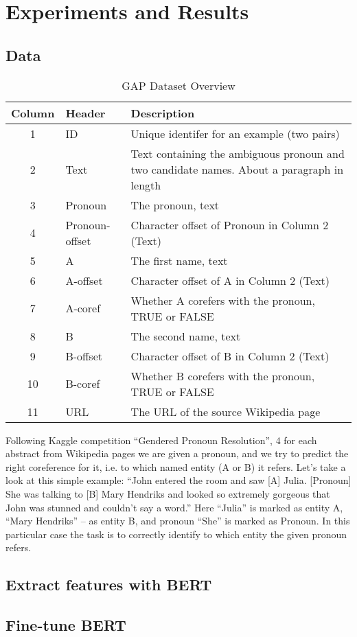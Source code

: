 \chapter{Experiments and Results}


\section{Data}


\begin{table}[htbp]
  \centering
  \caption[GAP Column]{GAP Dataset Overview}
  \label{tab:template-files}
    \begin{tabularx}{\linewidth}{clX}
      \toprule[1.5pt]
      \textbf{Column} & \textbf{Header} & \textbf{Description} \\\midrule[1pt]
      1 & ID & Unique identifer for an example (two pairs)\\
      2 & Text & Text containing the ambiguous pronoun and two candidate names. About a paragraph in length\\
      3 & Pronoun & The pronoun, text\\
      4 & Pronoun-offset	 & Character offset of Pronoun in Column 2 (Text)\\
      5 & A & The first name, text\\
      6 & A-offset	 & Character offset of A in Column 2 (Text)\\
      7 & A-coref	 & Whether A corefers with the pronoun, TRUE or FALSE\\
      8 & B & The second name, text\\
      9 & B-offset	 & Character offset of B in Column 2 (Text)\\
      10 & B-coref	 & Whether B corefers with the pronoun, TRUE or FALSE\\
      11 & URL & The URL of the source Wikipedia page\\
      \bottomrule[1.5pt]
    \end{tabularx}
\end{table}

Following Kaggle competition “Gendered Pronoun Resolution”, 4 for each abstract from Wikipedia pages we are given a pronoun, and we try to predict the right coreference for it, i.e. to which named entity (A or B) it refers. Let’s take a look at this simple example:
“John entered the room and saw [A] Julia. [Pronoun] She was talking to [B] Mary Hendriks and looked so extremely gorgeous that John was stunned and couldn’t say a word.”
Here “Julia” is marked as entity A, “Mary Hendriks” – as entity B, and pronoun “She” is marked as Pronoun. In this particular case the task is to correctly identify to which entity the given pronoun refers.

\section{Extract features with BERT}

\section{Fine-tune BERT}


